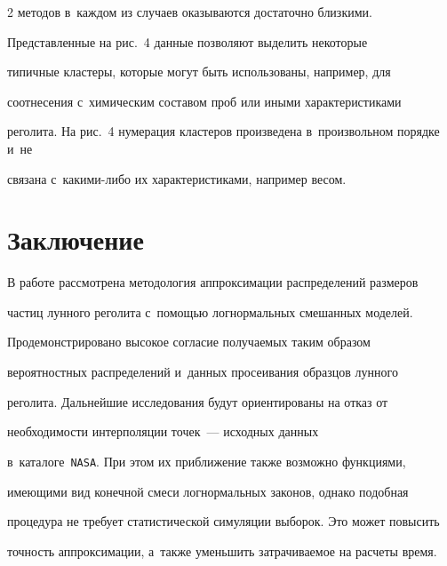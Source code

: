 \begin{multicols}{2}
методов в~каждом из случаев оказываются достаточно близкими. 


Представленные на рис.~4 данные позволяют выделить некоторые 


типичные кластеры, которые могут быть использованы, например, для 


соотнесения с~химическим составом проб или иными характеристиками 


реголита. На рис.~4 нумерация клас\-те\-ров произведена в~произвольном порядке и~не


связана с~ка\-ки\-ми-ли\-бо их характеристиками, например весом.





\vspace*{-6pt}








\section{Заключение}





\vspace*{-2pt}





В работе рассмотрена методология аппрок\-си\-мации распределений размеров 


частиц лунного ре\-голита с~помощью логнормальных смешанных мо\-делей. 


Продемонстрировано высокое согласие получа\-емых таким образом 


вероятностных распределений и~данных просеивания образцов лунного 


реголита. Дальнейшие исследования будут ориентированы на отказ от 


необходимости интерполяции точек~--- исходных данных 


в~каталоге~\verb"NASA". При этом их приближение также возможно функциями, 


имеющими вид конечной смеси логнормальных законов, однако подобная 


процедура не требует статистической симуляции выборок. Это может повысить 


точность аппроксимации, а~также уменьшить затрачиваемое на расчеты время.









\end{multicols}
